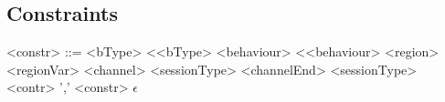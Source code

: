 \documentclass[12pt]{article}
\begin{document}
\subsection{Constraints}

\begin{grammar}

<constr> ::= <bType> \textless <bType>
\alt <behaviour> \textless <behaviour>
\alt <region> \texttildelow <regionVar>
\alt <channel> \texttildelow <sessionType>
\alt <channelEnd> \texttildelow <sessionType>
\alt <contr> ',' <constr>
\alt $\epsilon$

\end{grammar}


\end{document}
